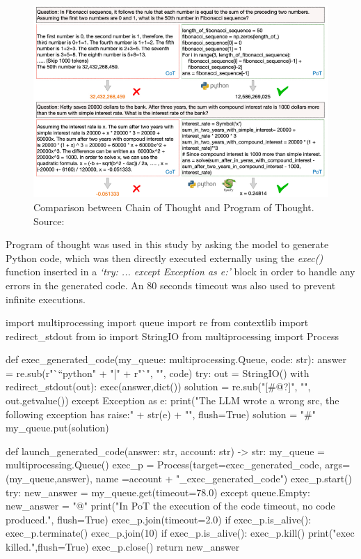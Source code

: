 \documentclass[12pt]{article}
\begin{document}
    \begin{figure}[H]
    \centering
            \includegraphics[width=1\textwidth]{PoTTheory.png}
    \caption[Comparison between Chain of Thought and Program of Thought]{Comparison between Chain of Thought and Program of Thought. Source: \cite{chen2023programthoughtspromptingdisentangling}}
    \end{figure} 
    
    Program of thought was used in this study by asking the model to generate Python code, which was then directly executed externally using the \textit{exec()} function inserted in a \textit{‘try: ... except Exception as e:’} block in order to handle any errors in the generated code. An 80 seconds timeout was also used to prevent infinite executions.
    
    \begin{python}
import multiprocessing
import queue
import re
from contextlib import redirect_stdout
from io import StringIO
from multiprocessing import Process



def exec_generated_code(my_queue: multiprocessing.Queue, code: str):
    answer = re.sub(r"```python" + "|" + r"`", "", code)
    try:
        out = StringIO()
        with redirect_stdout(out):
            exec(answer,dict())
        solution = re.sub("[#@?]", "", out.getvalue())
    except Exception as e:
        print("The LLM wrote a wrong src, the following exception has raise:\n" + str(e) + "\n", flush=True)
        solution = "#"
    my_queue.put(solution)


def launch_generated_code(answer: str, account: str) -> str:
    my_queue = multiprocessing.Queue()
    exec_p = Process(target=exec_generated_code, args=(my_queue,answer), name =account + "_exec_generated_code")
    exec_p.start()
    try:
        new_answer = my_queue.get(timeout=78.0)
    except queue.Empty:
        new_answer = "@"
        print("In PoT the execution of the code timeout, no code produced.", flush=True)
    exec_p.join(timeout=2.0)
    if exec_p.is_alive():
        exec_p.terminate()
        exec_p.join(10)
        if exec_p.is_alive():
            exec_p.kill()
        print("exec killed.",flush=True)
    exec_p.close()
    return new_answer
\end{python}
\end{document}

